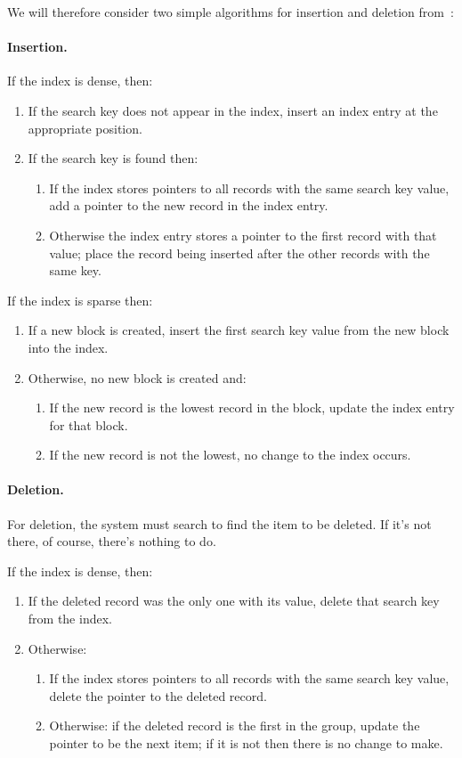 We will therefore consider two simple algorithms for insertion and deletion from~\cite{dsc}:

\paragraph{Insertion.}
If the index is dense, then:
\begin{enumerate}
	\item If the search key does not appear in the index, insert an index entry at the appropriate position.
	\item If the search key is found then:
		\begin{enumerate}
			\item If the index stores pointers to all records with the same search key value, add a pointer to the new record in the index entry.
			\item Otherwise the index entry stores a pointer to the first record with that value; place the record being inserted after the other records with the same key.
		\end{enumerate}
\end{enumerate}

If the index is sparse then:

\begin{enumerate}
	\item If a new block is created, insert the first search key value from the new block into the index.
	\item Otherwise, no new block is created and:
		\begin{enumerate}
			\item If the new record is the lowest record in the block, update the index entry for that block.
			\item If the new record is not the lowest, no change to the index occurs.
		\end{enumerate}
\end{enumerate}

\paragraph{Deletion.}

For deletion, the system must search to find the item to be deleted. If it's not there, of course, there's nothing to do. 

If the index is dense, then:
\begin{enumerate}
	\item If the deleted record was the only one with its value, delete that search key from the index.
	\item Otherwise:
		\begin{enumerate}
			\item If the index stores pointers to all records with the same search key value, delete the pointer to the deleted record.
			\item Otherwise: if the deleted record is the first in the group, update the pointer to be the next item; if it is not then there is no change to make.
		\end{enumerate}
\end{enumerate}

